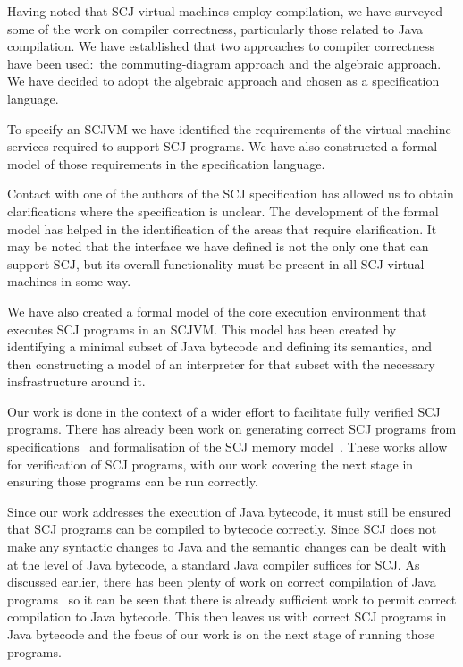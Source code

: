 \documentclass[a4paper,10pt]{report}
\begin{document}
Having noted that SCJ virtual machines employ compilation, we have
surveyed some of the work on compiler correctness, particularly those
related to Java compilation.
We have established that two approaches to compiler correctness have
been used:~the commuting-diagram approach and the algebraic approach.
We have decided to adopt the algebraic approach and chosen \Circus{}
as a specification language.

To specify an SCJVM we have identified the requirements
of the virtual machine services required to support SCJ programs.
We have also constructed a formal model of those requirements in the
\Circus{} specification language.

Contact with one of the authors of the SCJ specification has allowed
us to obtain clarifications where the specification is unclear.
The development of the formal model has helped in the
identification of the areas that require clarification.
It may be noted that the interface we have defined is not the only one
that can support SCJ, but its overall functionality
must be present in all SCJ virtual machines in some way.

We have also created a formal model of the core execution environment
that executes SCJ programs in an SCJVM.
This model has been created by identifying a minimal subset of Java
bytecode and defining its semantics, and then constructing a \Circus{}
model of an interpreter for that subset with the necessary
insfrastructure around it.

Our work is done in the context of a wider effort to facilitate fully
verified SCJ programs.
There has already been work on generating correct SCJ programs from
\Circus{} specifications~\cite{cavalcanti2011, cavalcanti2013} and
formalisation of the SCJ memory model~\cite{cavalcanti2011a}.
These works allow for verification of SCJ programs, with our work
covering the next stage in ensuring those programs can be run
correctly.

Since our work addresses the execution of Java bytecode, it must still
be ensured that SCJ programs can be compiled to bytecode correctly.
Since SCJ does not make any syntactic changes to Java and the
semantic changes can be dealt with at the level of Java bytecode, a
standard Java compiler suffices for SCJ.
As discussed earlier, there has been plenty of work on correct
compilation of Java programs~\cite{klein2006, strecker2002,
  lochbihler2010, duran2005, stark2001} so it can be seen that there
is already sufficient work to permit correct compilation to Java
bytecode.
This then leaves us with correct SCJ programs in Java bytecode and the
focus of our work is on the next stage of running those programs.
\end{document}
